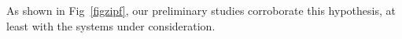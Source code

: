\documentclass[onecolumn, compsoc,11pt]{IEEEtran}
\begin{document}
As shown in Fig~\ref{figzipf}, our preliminary studies corroborate this hypothesis, at least with the systems under consideration.



\end{document}
